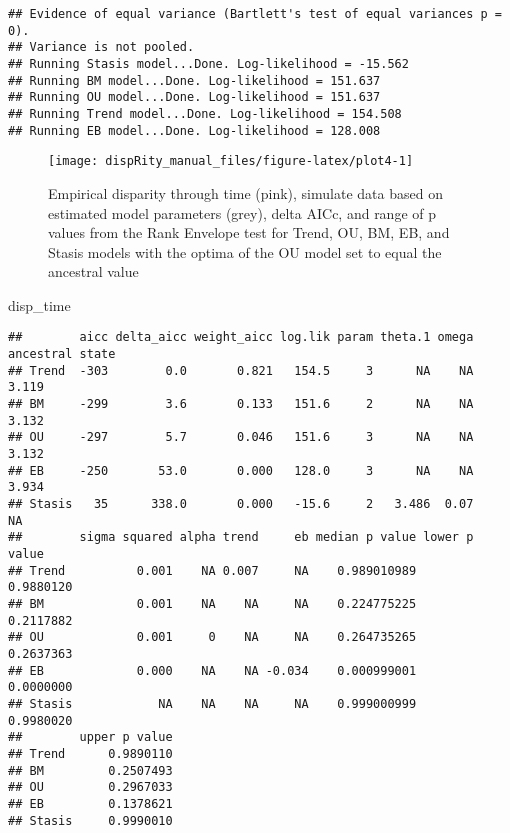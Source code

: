 \documentclass[
]{book}
\newenvironment{Shaded}{\begin{snugshade}}{\end{snugshade}}
\newcommand{\NormalTok}[1]{#1}
\begin{document}
\begin{verbatim}
## Evidence of equal variance (Bartlett's test of equal variances p = 0).
## Variance is not pooled.
## Running Stasis model...Done. Log-likelihood = -15.562
## Running BM model...Done. Log-likelihood = 151.637
## Running OU model...Done. Log-likelihood = 151.637
## Running Trend model...Done. Log-likelihood = 154.508
## Running EB model...Done. Log-likelihood = 128.008
\end{verbatim}

\begin{figure}

{\centering \texttt{[image: dispRity\_manual\_files/figure-latex/plot4-1]} 

}

\caption{Empirical disparity through time (pink), simulate data based on estimated model parameters (grey), delta AICc, and range of p values from the Rank Envelope test for Trend, OU, BM, EB, and Stasis models with the optima of the OU model set to equal the ancestral value}\label{fig:plot4}
\end{figure}

\begin{Shaded}
\begin{Highlighting}[]
\NormalTok{disp\_time}
\end{Highlighting}
\end{Shaded}

\begin{verbatim}
##        aicc delta_aicc weight_aicc log.lik param theta.1 omega ancestral state
## Trend  -303        0.0       0.821   154.5     3      NA    NA           3.119
## BM     -299        3.6       0.133   151.6     2      NA    NA           3.132
## OU     -297        5.7       0.046   151.6     3      NA    NA           3.132
## EB     -250       53.0       0.000   128.0     3      NA    NA           3.934
## Stasis   35      338.0       0.000   -15.6     2   3.486  0.07              NA
##        sigma squared alpha trend     eb median p value lower p value
## Trend          0.001    NA 0.007     NA    0.989010989     0.9880120
## BM             0.001    NA    NA     NA    0.224775225     0.2117882
## OU             0.001     0    NA     NA    0.264735265     0.2637363
## EB             0.000    NA    NA -0.034    0.000999001     0.0000000
## Stasis            NA    NA    NA     NA    0.999000999     0.9980020
##        upper p value
## Trend      0.9890110
## BM         0.2507493
## OU         0.2967033
## EB         0.1378621
## Stasis     0.9990010
\end{verbatim}
\end{document}
